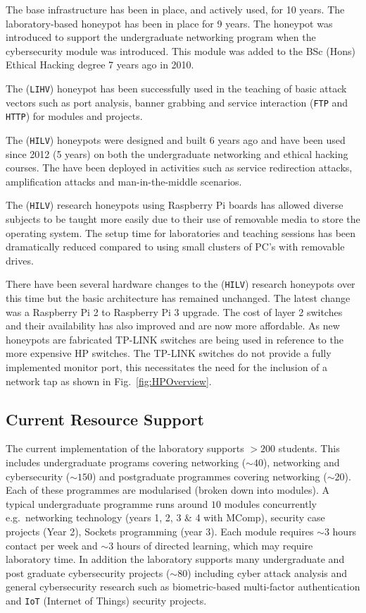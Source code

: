 \documentclass{llncs}
\begin{document}
The base infrastructure has been in place, and actively used, for 10 years. The
laboratory-based honeypot has been in place for 9 years. The honeypot was
introduced to support the undergraduate networking program when the
cybersecurity module was introduced. This module was added to the BSc (Hons)
Ethical Hacking degree 7 years ago in 2010.

The (\texttt{LIHV}) honeypot has been successfully used in the teaching of
basic attack vectors such as port analysis, banner grabbing and service
interaction (\texttt{FTP} and \texttt{HTTP}) for modules and projects.

The (\texttt{HILV}) honeypots were designed and built 6 years ago and have been
used since 2012 (5 years) on both the undergraduate networking and ethical
hacking courses. The have been deployed in activities such as service
redirection attacks, amplification attacks and man-in-the-middle scenarios.

The (\texttt{HILV}) research honeypots using Raspberry Pi boards has allowed
diverse subjects to be taught more easily due to their use of removable media
to store the operating system. The setup time for laboratories and teaching
sessions has been dramatically reduced compared to using small clusters of PC's
with removable drives.

There have been several hardware changes to the (\texttt{HILV}) research
honeypots over this time but the basic architecture has remained unchanged. The
latest change was a Raspberry Pi 2 to Raspberry Pi 3 upgrade. The cost of layer
2 switches and their availability has also improved and are now more
affordable. As new honeypots are fabricated TP-LINK switches are being used in
reference to the more expensive HP switches. The TP-LINK switches do not
provide a fully implemented monitor port, this necessitates the need for the
inclusion of a network tap as shown in Fig.~\ref{fig:HPOverview}.

\subsection{Current Resource Support\label{ResourceSupport}}

The current implementation of the laboratory supports $>200$ students. This
includes undergraduate programs covering networking ($\sim40$), networking and
cybersecurity ($\sim150$) and postgraduate programmes covering networking
($\sim20$). Each of these programmes are modularised (broken down into
modules).  A typical undergraduate programme runs around $10$ modules
concurrently e.g.\ networking technology (years 1, 2, 3 \& 4 with MComp),
security case projects (Year 2), Sockets programming (year 3). Each module
requires $\sim3$ hours contact per week and $\sim3$ hours of directed learning,
which may require laboratory time. In addition the laboratory supports many
undergraduate and post graduate cybersecurity projects ($\sim80$) including
cyber attack analysis and general cybersecurity research such as
biometric-based multi-factor authentication and \texttt{IoT} (Internet of
Things) security projects.
\end{document}
